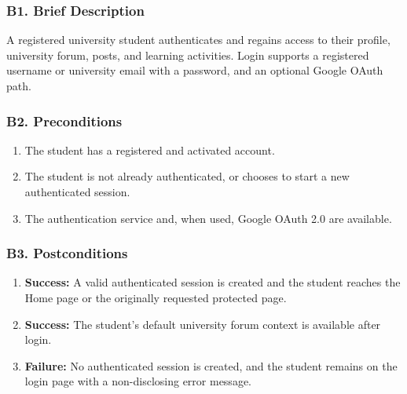 \documentclass[12pt]{article}
\begin{document}
\hypertarget{sec:b1-brief-description}{}
\subsubsection*{B1. Brief Description}
\par\medskip

A registered university student authenticates and regains access to their profile, university forum, posts, and learning activities. Login supports a registered username or university email with a password, and an optional Google OAuth path.
\par\medskip

\hypertarget{sec:b2-preconditions}{}
\subsubsection*{B2. Preconditions}
\par\medskip

\begin{enumerate}
\item The student has a registered and activated account.
\item The student is not already authenticated, or chooses to start a new authenticated session.
\item The authentication service and, when used, Google OAuth 2.0 are available.
\end{enumerate}
\par\medskip

\hypertarget{sec:b3-postconditions}{}
\subsubsection*{B3. Postconditions}
\par\medskip

\begin{enumerate}
\item \textbf{Success:} A valid authenticated session is created and the student reaches the Home page or the originally requested protected page.
\item \textbf{Success:} The student's default university forum context is available after login.
\item \textbf{Failure:} No authenticated session is created, and the student remains on the login page with a non-disclosing error message.
\end{enumerate}
\par\medskip
\end{document}
